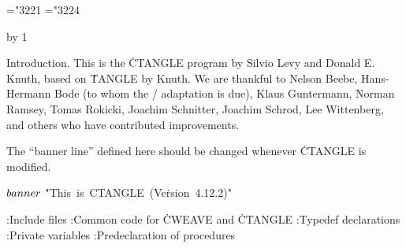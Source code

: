 






\def\hang{\hangindent 3em\indent\ignorespaces}
\def\pb{$\.|\ldots\.|$} %
\def\v{\char'174} %
\mathchardef\RA="3221 %
\mathchardef\BA="3224 %

\def\title{CTANGLE (Version 4.12.2)}
\def\topofcontents{\null\vfill
  \centerline{\titlefont The {\ttitlefont CTANGLE} processor}
  \vskip 15pt
  \centerline{(Version 4.12.2)}
  \vfill}
\def\botofcontents{\vfill\titlefalse}
\def\contentspagenumber{65}
\def\title{APPENDIX E: CTANGLE}
\let\K=\leftarrow
\pageno=\contentspagenumber \advance\pageno by 1
\let\maybe=\iftrue


Introduction.
This is the \.{CTANGLE} program by Silvio Levy and Donald E. Knuth,
based on \.{TANGLE} by Knuth.
We are thankful to
Nelson Beebe, Hans-Hermann Bode (to whom the \CPLUSPLUS/ adaptation is due),
Klaus Guntermann, Norman Ramsey, Tomas Rokicki, Joachim Schnitter,
Joachim Schrod, Lee Wittenberg, and others who have contributed improvements.

The ``banner line'' defined here should be changed whenever \.{CTANGLE}
is modified.

\Y\B\4\D$\\{banner}$ \5
\.{"This\ is\ CTANGLE\ (Ve}\)\.{rsion\ 4.12.2)"}\par
\Y\B{}:Include files\X\6
\ATH\6
:Common code for \.{CWEAVE} and \.{CTANGLE}\X\6
:Typedef declarations\X\6
:Private variables\X\6
:Predeclaration of procedures\X\par
\fi

